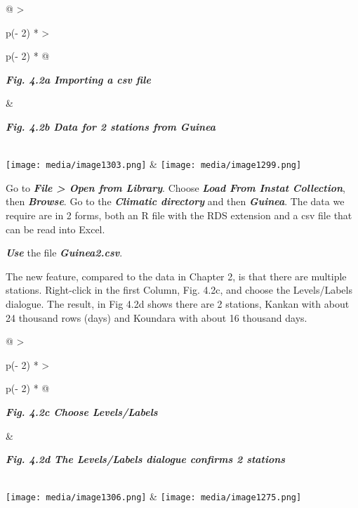 \documentclass[
  letterpaper,
  DIV=11,
  numbers=noendperiod]{scrreprt}
\begin{document}
\begin{longtable}[]{@{}
  >{\raggedright\arraybackslash}p{(\columnwidth - 2\tabcolsep) * }
  >{\raggedright\arraybackslash}p{(\columnwidth - 2\tabcolsep) * }@{}}
\toprule\noalign{}
\begin{minipage}[b]{\linewidth}\raggedright
\textbf{\emph{Fig. 4.2a Importing a csv file}}
\end{minipage} & \begin{minipage}[b]{\linewidth}\raggedright
\textbf{\emph{Fig. 4.2b Data for 2 stations from Guinea}}
\end{minipage} \\
\midrule\noalign{}
\endhead
\bottomrule\noalign{}
\endlastfoot
\texttt{[image: media/image1303.png]}
&
\texttt{[image: media/image1299.png]} \\
\end{longtable}

Go to \textbf{\emph{File \textgreater{} Open from Library}}. Choose
\textbf{\emph{Load From Instat Collection}}, then
\textbf{\emph{Browse}}. Go to the \textbf{\emph{Climatic directory}} and
then \textbf{\emph{Guinea}}. The data we require are in 2 forms, both an
R file with the RDS extension and a csv file that can be read into
Excel.

\textbf{\emph{Use}} the file \textbf{\emph{Guinea2.csv}}.

The new feature, compared to the data in Chapter 2, is that there are
multiple stations. Right-click in the first Column, Fig. 4.2c, and
choose the Levels/Labels dialogue. The result, in Fig 4.2d shows there
are 2 stations, Kankan with about 24 thousand rows (days) and Koundara
with about 16 thousand days.

\begin{longtable}[]{@{}
  >{\raggedright\arraybackslash}p{(\columnwidth - 2\tabcolsep) * }
  >{\raggedright\arraybackslash}p{(\columnwidth - 2\tabcolsep) * }@{}}
\toprule\noalign{}
\begin{minipage}[b]{\linewidth}\raggedright
\textbf{\emph{Fig. 4.2c Choose Levels/Labels}}
\end{minipage} & \begin{minipage}[b]{\linewidth}\raggedright
\textbf{\emph{Fig. 4.2d The Levels/Labels dialogue confirms 2 stations}}
\end{minipage} \\
\midrule\noalign{}
\endhead
\bottomrule\noalign{}
\endlastfoot
\texttt{[image: media/image1306.png]} &
\texttt{[image: media/image1275.png]} \\
\end{longtable}
\end{document}
